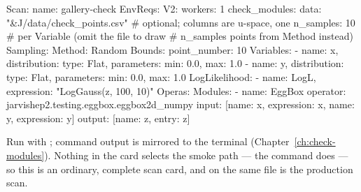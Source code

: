 \begin{yamlwin}
Scan: {name: gallery-check}
EnvReqs:
  V2:
    workers: 1
    check_modules:
      data: "&J/data/check_points.csv"  # optional; columns are u-space, one
      n_samples: 10                     # per Variable (omit the file to draw
                                        # n_samples points from Method instead)
Sampling:
  Method: Random
  Bounds: {point_number: 10}
  Variables:
    - {name: x, distribution: {type: Flat, parameters: {min: 0.0, max: 1.0}}}
    - {name: y, distribution: {type: Flat, parameters: {min: 0.0, max: 1.0}}}
  LogLikelihood:
    - {name: LogL, expression: "LogGauss(z, 100, 10)"}
Operas:
  Modules:
    - name: EggBox
      operator: jarvishep2.testing.eggbox.eggbox2d_numpy
      input:  [{name: x, expression: x}, {name: y, expression: y}]
      output: [{name: z, entry: z}]
\end{yamlwin}

Run with ; command output is mirrored to the
terminal (Chapter~\ref{ch:check-modules}). Nothing in the card selects the smoke path
--- the command does --- so this is an ordinary, complete scan card, and
 on the same file is the production scan.
